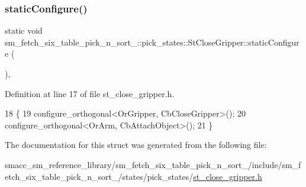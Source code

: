 \subsubsection{\texorpdfstring{static\+Configure()}{staticConfigure()}}
{\footnotesize\ttfamily static void sm\+\_\+fetch\+\_\+six\+\_\+table\+\_\+pick\+\_\+n\+\_\+sort\+\_\+::pick\+\_\+states\+::\+St\+Close\+Gripper\+::static\+Configure (\begin{DoxyParamCaption}{ }\end{DoxyParamCaption})\hspace{0.3cm}{\ttfamily [inline]}, {\ttfamily [static]}}



Definition at line 17 of file st\+\_\+close\+\_\+gripper.\+h.


\begin{DoxyCode}
18          \{
19             configure\_orthogonal<OrGripper, CbCloseGripper>();
20             configure\_orthogonal<OrArm, CbAttachObject>();
21          \}
\end{DoxyCode}


The documentation for this struct was generated from the following file\+:\begin{DoxyCompactItemize}
\item 
smacc\+\_\+sm\+\_\+reference\+\_\+library/sm\+\_\+fetch\+\_\+six\+\_\+table\+\_\+pick\+\_\+n\+\_\+sort\+\_/include/sm\+\_\+fetch\+\_\+six\+\_\+table\+\_\+pick\+\_\+n\+\_\+sort\+\_/states/pick\+\_\+states/\hyperlink{sm__fetch__six__table__pick__n__sort__1_2include_2sm__fetch__six__table__pick__n__sort__1_2state6114a45d1f7943cfc3c1271dff58a370}{st\+\_\+close\+\_\+gripper.\+h}\end{DoxyCompactItemize}
